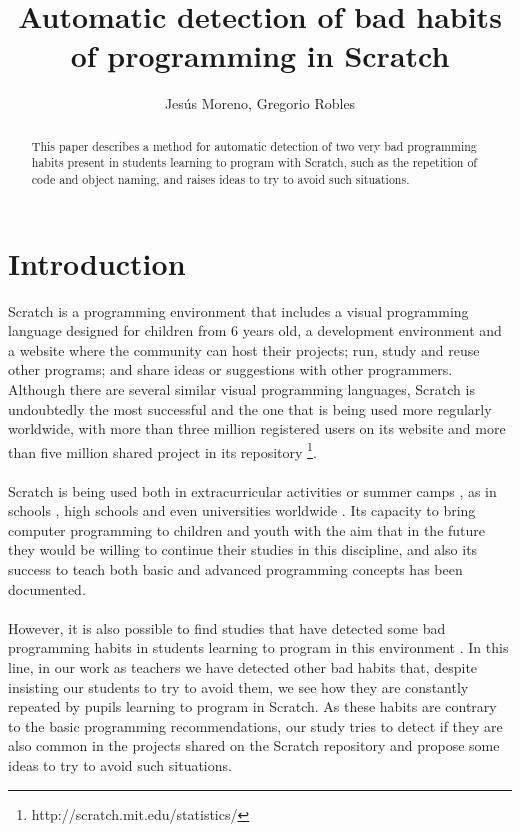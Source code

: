 \documentclass[a4paper,10pt]{article}
\title{Automatic detection of bad habits of programming in Scratch}
\author{Jesús Moreno, Gregorio Robles}
\begin{document}
\maketitle

\begin{abstract}
This paper describes a method for automatic detection of two very bad programming habits present in students learning to program with Scratch, such as the repetition of code and object naming, and raises ideas to try to avoid such situations.

\end{abstract}

\section{Introduction}
Scratch \cite{resnick2009scratch}  is a programming environment that includes a visual programming language designed for children from 6 years old, a development environment and a website where the community can host their projects; run, study and reuse other programs; and share ideas or suggestions with other programmers. Although there are several similar visual programming languages, Scratch is undoubtedly the most successful and the one that is being used more regularly worldwide, with more than three million registered users on its website and more than five million shared project in its repository \footnote{http://scratch.mit.edu/statistics/}.
\paragraph{}Scratch is being used both in extracurricular activities \cite{maloney2008programming, kafai2010entering} or summer camps \cite{adams2010scratching, franklin2013assessment}, as in schools \cite{wilson2012evaluation}, high schools \cite{meerbaum2013learning} and even universities worldwide \cite{wolz2009starting, malan2007scratch}. Its capacity to bring computer programming to children and youth with the aim that in the future they would be willing to continue their studies in this discipline, and also its success to teach both basic and advanced programming concepts has been documented.
\paragraph{}However, it is also possible to find studies that have detected some bad programming habits in students learning to program in this environment \cite{meerbaum2011habits}. In this line, in our work as teachers we have detected other bad habits that, despite insisting our students to try to avoid them, we see how they are constantly repeated by pupils learning to program in Scratch. As these habits are contrary to the basic programming recommendations, our study tries to detect if they are also common in the projects shared on the Scratch repository and propose some ideas to try to avoid such situations.
\end{document}
